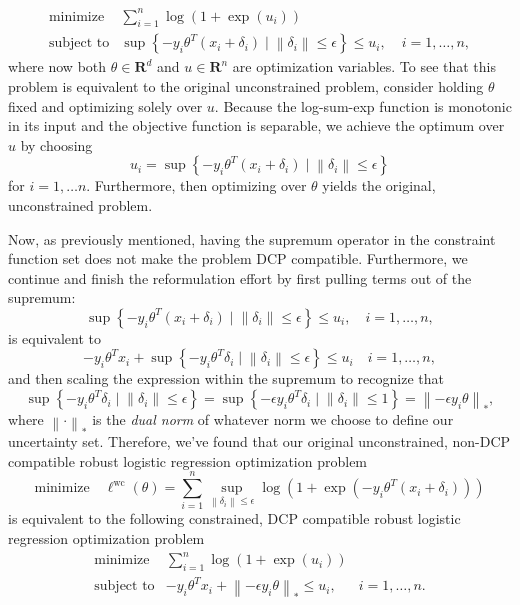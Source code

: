 \documentclass[12pt,reqno]{article}
\theoremstyle{definition}
\numberwithin{equation}{section}
\begin{document}
\[\begin{array}{lll}
\text{minimize} \; & \sum_{i=1}^n \log \left(1+\exp \left(u_i\right)\right) & \\
\text{subject to} & \sup \left\{-y_i \theta^T\left(x_i+\delta_i\right) \mid \left\lVert \delta_i \right\rVert \le \epsilon \right\} \le u_i, \; & i = 1, \ldots, n,
\end{array}\]
where now both $\theta \in \mathbf{R}^d$ and $u \in \mathbf{R}^n$ are optimization variables.
To see that this problem is equivalent to the original unconstrained problem, consider holding $\theta$ fixed
and optimizing solely over $u$. Because the log-sum-exp function is monotonic in its input and the objective function is separable, we achieve the optimum over $u$ by choosing
\[u_i = \sup \left\{-y_i \theta^T\left(x_i+\delta_i\right) \mid \left\lVert \delta_i \right\rVert \le \epsilon \right\} \]
for $i = 1, \ldots n$. Furthermore, then optimizing over $\theta$ yields the original, unconstrained problem.

Now, as previously mentioned, having the supremum operator in the constraint function set does not
make the problem DCP compatible. Furthermore, we continue and finish the reformulation effort by first
pulling terms out of the supremum:
\[\sup \left\{-y_i \theta^T\left(x_i+\delta_i\right) \mid \left\lVert \delta_i \right\rVert \le \epsilon \right\} \le u_i, \quad i = 1, \ldots, n,\]
is equivalent to
\[-y_i\theta^Tx_i + \sup \left\{ -y_i \theta^T \delta_i \mid \left\lVert \delta_i \right\rVert \le \epsilon \right\} \le u_i \quad i = 1, \ldots, n,\]
and then scaling the expression within the supremum
to recognize that 
\[\sup \left\{ -y_i \theta^T \delta_i \mid \left\lVert \delta_i \right\rVert \le \epsilon \right\} = \sup \left\{ -\epsilon y_i \theta^T \delta_i \mid \left\lVert \delta_i \right\rVert \le 1 \right\} = \left\lVert -\epsilon y_i \theta \right\rVert_{*},\]
where $\left\lVert \cdot \right\rVert_{*}$ is the \textit{dual norm} of whatever norm we choose to define our uncertainty set.
Therefore, we've found that our original unconstrained, non-DCP compatible robust logistic regression optimization problem
\[\mathrm{minimize} \quad \ell^{\mathrm{wc}}(\theta)=\sum_{i=1}^n \sup _{\left\|\delta_i\right\| \leq \epsilon} \log \left(1+\exp \left(-y_i \theta^T\left(x_i+\delta_i\right)\right)\right)\]
is equivalent to the following constrained, DCP compatible robust logistic regression optimization problem
\[\begin{array}{lll}
    \text{minimize} \; & \sum_{i=1}^n \log \left(1+\exp \left(u_i\right)\right) & \\
    \text{subject to} & -y_i\theta^Tx_i + \left\lVert -\epsilon y_i \theta \right\rVert_{*} \le u_i, \; & i = 1, \ldots, n.
    \end{array}\]
\end{document}
